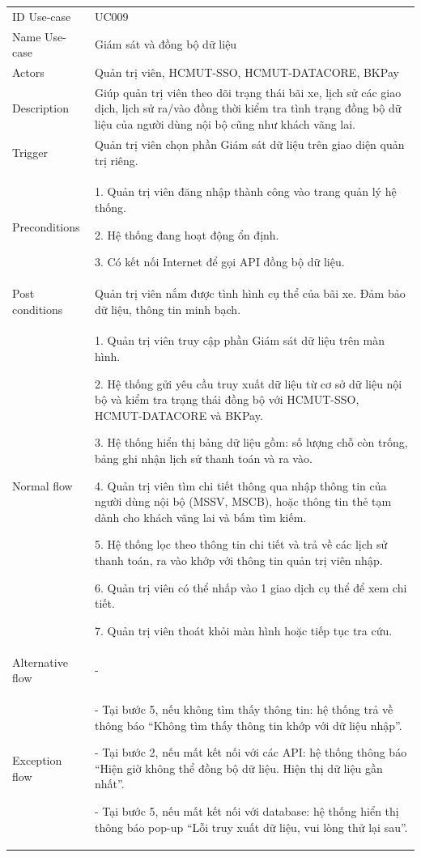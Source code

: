 \begin{center}
    \begin{tabular}{|m{2.5cm}|m{13cm}|}
    \hline
        ID Use-case  & UC009 \\ 
        Name Use-case & Giám sát và đồng bộ dữ liệu \\ 
    \hline
        Actors & Quản trị viên, HCMUT-SSO, HCMUT-DATACORE, BKPay \\
    \hline
        Description & Giúp quản trị viên theo dõi trạng thái bãi xe, lịch sử các giao dịch, lịch sử ra/vào đồng thời kiểm tra tình trạng đồng bộ dữ liệu của người dùng nội bộ cũng như khách vãng lai. \\
    \hline
        Trigger & Quản trị viên chọn phần Giám sát dữ liệu trên giao diện quản trị riêng. \\
    \hline
        Preconditions & 
        1. Quản trị viên đăng nhập thành công vào trang quản lý hệ thống.
        
        2. Hệ thống đang hoạt động ổn định.
        
        3. Có kết nối Internet để gọi API đồng bộ dữ liệu. \\
    \hline
        Post conditions & Quản trị viên nắm được tình hình cụ thể của bãi xe. Đảm bảo dữ liệu, thông tin minh bạch. \\
    \hline
        Normal flow & 
        1. Quản trị viên truy cập phần Giám sát dữ liệu trên màn hình.
        
        2. Hệ thống gửi yêu cầu truy xuất dữ liệu từ cơ sở dữ liệu nội bộ và kiểm tra trạng thái đồng bộ với HCMUT-SSO, HCMUT-DATACORE và BKPay.
        
        3. Hệ thống hiển thị bảng dữ liệu gồm: số lượng chỗ còn trống, bảng ghi nhận lịch sử thanh toán và ra vào.
        
        4. Quản trị viên tìm chi tiết thông qua nhập thông tin của người dùng nội bộ (MSSV, MSCB), hoặc thông tin thẻ tạm dành cho khách vãng lai và bấm tìm kiếm.
        
        5. Hệ thống lọc theo thông tin chi tiết và trả về các lịch sử thanh toán, ra vào khớp với thông tin quản trị viên nhập.
        
        6. Quản trị viên có thể nhấp vào 1 giao dịch cụ thể để xem chi tiết.
        
        7. Quản trị viên thoát khỏi màn hình hoặc tiếp tục tra cứu. \\
    \hline
        Alternative flow & - \\ 
    \hline
        Exception flow & 
        - Tại bước 5, nếu không tìm thấy thông tin: hệ thống trả về thông báo “Không tìm thấy thông tin khớp với dữ liệu nhập”.
        
        - Tại bước 2, nếu mất kết nối với các API: hệ thống thông báo “Hiện giờ không thể đồng bộ dữ liệu. Hiện thị dữ liệu gần nhất”.
        
        - Tại bước 5, nếu mất kết nối với database: hệ thống hiển thị thông báo pop-up “Lỗi truy xuất dữ liệu, vui lòng thử lại sau”. \\
    \hline
    \end{tabular}
\end{center}